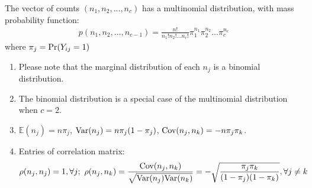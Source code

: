 \documentclass[11pt]{elegantbook}
\begin{document}
The vector of counts $(n_1,n_2,...,n_c)$ has a multinomial distribution, with mass probability function:
\begin{equation}
    \begin{aligned}
        p(n_1,n_2,...,n_{c-1})=\frac{n!}{n_1!n_2!...n_c!}\pi_1^{n_1}\pi_2^{n_2}...\pi_c^{n_c}
    \end{aligned}
    \nonumber
\end{equation}
where $\pi_j=\textnormal{Pr}(Y_{ij}=1)$
\begin{enumerate}
    \item Please note that the marginal distribution of each $n_j$ is a binomial distribution.
    \item The binomial distribution is a special case of the multinomial distribution when $c = 2$.
    \item $\mathbb{E}(n_j)=n\pi_j$, $\textnormal{Var}(n_j)=n\pi_j(1-\pi_j)$, $\textnormal{Cov}(n_j,n_k)=-n\pi_j\pi_k$.
    \item Entries of correlation matrix: $$\rho(n_j,n_j)=1,\forall j;\ \rho(n_j,n_k)=\frac{\textnormal{Cov}(n_j,n_k)}{\sqrt{\textnormal{Var}(n_j)\textnormal{Var}(n_k)}}=-\sqrt{\frac{\pi_j\pi_k}{(1-\pi_j)(1-\pi_k)}},\forall j\neq k$$
\end{enumerate}
\end{document}
